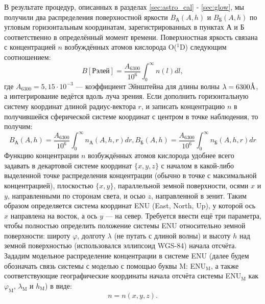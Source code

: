 \documentclass[12pt,a4paper]{article}
\newcommand{\angstrom}{\textup{\AA}}
\begin{document}
 В результате процедур, описанных в разделах \ref{sec:astro_cal} - \ref{sec:glow}, мы получили два распределения поверхностной яркости $B_\text{А} (A,h)$ и $B_\text{Б} (A,h)$ по угловым горизонтальным координатам, зарегистрированных в пунктах А и Б соответственно в определённый момент времени. Поверхностная яркость связана с концентрацией $n$ возбуждённых атомов кислорода O($^1$D) следующим соотношением:
 \begin{equation}\label{eq:mod1}
 B [\text{Рэлей}] = \frac{A_{6300}}{10^6}\int_0^\infty n(l)dl,
 \end{equation}
где 
$A_{6300}=5,15\cdot10^{-3}$ %
 \cite{Gustavsson2008} --- коэффициент Эйнштейна для длины волны $\lambda = 6300\angstrom$, а интегрирование ведётся вдоль луча зрения. Если дополнить горизонтальную систему координат длиной радиус-вектора $r$, и записать концентрацию $n$ в получившейся сферической системе координат с центром в точке наблюдения, то получим:
\begin{equation}\label{eq:mod2}
 B_\text{А} (A,h) = \frac{A_{6300}}{10^6}\int_0^\infty n_\text{А}(A,h,r)dr,
 B_\text{Б} (A,h) = \frac{A_{6300}}{10^6}\int_0^\infty n_\text{Б}(A,h,r)dr
\end{equation}
Функцию концентрации $n$ возбуждённых атомов кислорода удобнее всего задавать в декартовой системе координат $\{x,y,z\}$ с началом в какой-либо выделенной точке распределения концентрации (обычно в точке с максимальной концентрацией), плоскостью $\{x,y\}$, параллельной земной поверхности, осями $x$ и $y$, направленными по сторонам света, и осью $z$, направленной в зенит. Таким образом определяется система координат ENU (East, North, Up), у которой ось $x$ направлена на восток, а ось $y$ --- на север. Требуется ввести ещё три параметра, чтобы полностью определить положение системы ENU относительно земной поверхности: широту $\varphi$, долготу $\lambda$ (не путать с длиной волны) и высоту $h$ над земной поверхностью (использовался эллипсоид WGS-84) начала отсчёта. Зададим модельное распределение концентрации в системе ENU (далее будем обозначать связь системы с моделью с помощью буквы M: ENU$_\text{M}$, а также соответствующие географические координаты начала отсчёта системы ENU$_\text{M}$ как $\varphi_\text{M}$, $\lambda_\text{M}$ и $h_\text{M}$) в виде:
\begin{equation}\label{eq:mod3}
n=n(x,y,z).
\end{equation}
\end{document}

